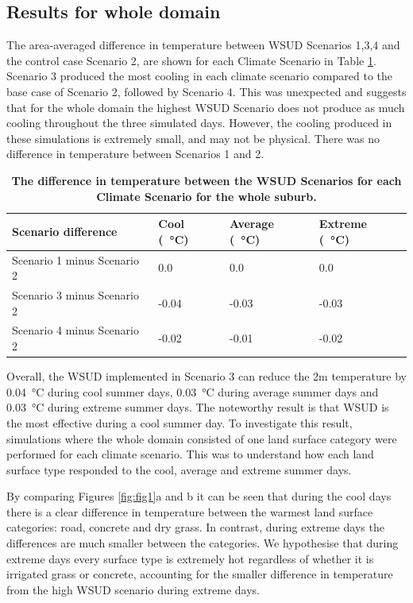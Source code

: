 \documentclass[final,3p,times,authoryear]{elsarticle}
\begin{document}
\subsection{Results for whole domain}\label{sec:3}


The area-averaged difference in temperature between WSUD Scenarios 1,3,4 and the control case Scenario 2, are shown for each Climate Scenario in Table \ref{tab:scenarioDiff}. Scenario 3 produced the most cooling in each climate scenario compared to the base case of Scenario 2, followed by Scenario 4. This was unexpected and suggests that for the whole domain the highest WSUD Scenario does not produce as much cooling throughout the three simulated days. However, the cooling produced in these simulations is extremely small, and may not be physical. There was no difference in temperature between Scenarios 1 and 2. 


\begin{table}[!htbp]
\caption{\bf The difference in temperature between the WSUD Scenarios for each Climate Scenario for the whole suburb.  \label{tab:scenarioDiff}}     
\begin{tabular}{ l l l l}
\textbf{Scenario difference} & \textbf{Cool (\SI{}{\degreeCelsius})}
& \textbf{Average (\SI{}{\degreeCelsius})}
& \textbf{Extreme (\SI{}{\degreeCelsius})}\\ \hline
Scenario 1 minus Scenario 2 & 0.0  & 0.0 & 0.0\\ 
Scenario 3 minus Scenario 2 & -0.04  & -0.03 & -0.03\\ 
Scenario 4 minus Scenario 2 & -0.02  & -0.01 & -0.02\\ 
\hline
\end{tabular}
\end{table}



Overall, the WSUD implemented in Scenario 3 can reduce the 2m temperature by 0.04\SI{}{\degreeCelsius} during cool summer days, 0.03\SI{}{\degreeCelsius} during average summer days and 0.03\SI{}{\degreeCelsius} during extreme summer days. The noteworthy result is that WSUD is the most effective during a cool summer day. To investigate this result, simulations where the whole domain consisted of one land surface category were performed for each climate scenario. This was to understand how each land surface type responded to the cool, average and extreme summer days.

By comparing Figures \ref{fig:fig1}a and b it can be seen that during the cool days there is a clear difference in temperature between the warmest land surface categories: road, concrete and dry grass. In contrast, during extreme days the differences are much smaller between the categories. We hypothesise that during extreme days every surface type is extremely hot regardless of whether it is irrigated grass or concrete, accounting for the smaller difference in temperature from the high WSUD scenario during extreme days.
\end{document}
